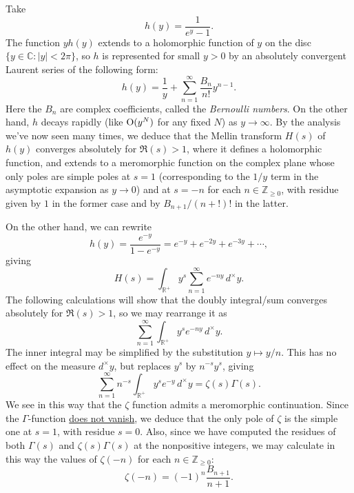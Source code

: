 \documentclass[reqno]{amsart}  \numberwithin{theorem}{section} \numberwithin{equation}{section}
\begin{document}
\begin{example}
  Take
  \begin{equation*}
h(y) = \frac{1}{e^y - 1}.
  \end{equation*}
  The function $y h(y)$ extends to a holomorphic function of $y$ on the disc $\{y \in \mathbb{C} : \lvert y \rvert < 2 \pi \}$, so $h$ is represented for small $y > 0$ by an absolutely convergent Laurent series of the following form:
  \begin{equation*}
h(y) = \frac{1}{y} + \sum_{n = 1 }^\infty \frac{B_n  }{ n !} y^{n - 1}.
  \end{equation*}
  Here the $B_n$ are complex coefficients, called the \emph{Bernoulli numbers}.  On the other hand, $h$ decays rapidly (like $\operatorname{O}(y^N)$ for any fixed $N$) as $y \rightarrow \infty$.  By the analysis we've now seen many times, we deduce that the Mellin transform $H(s)$ of $h(y)$ converges absolutely for $\Re(s) > 1$, where it defines a holomorphic function, and extends to a meromorphic function on the complex plane whose only poles are simple poles at $s = 1$ (corresponding to the $1/y$ term in the asymptotic expansion as $y \rightarrow 0$) and at $s = -n$ for each $n \in \mathbb{Z}_{\geq 0}$, with residue given by $1$ in the former case and by $B_{n+1} / (n+!)!$ in the latter.

  On the other hand, we can rewrite
  \begin{equation*}
    h(y) = \frac{e^{- y}}{ 1 - e^{- y}}
    = e^{- y } + e^{- 2 y } + e^{- 3 y} + \dotsb,
  \end{equation*}
  giving
  \begin{equation*}
    H(s) = \int_{\mathbb{R}^+ } y^s \sum_{n = 1 }^\infty e^{- n y } \,d^\times y.
  \end{equation*}
  The following calculations will show that the doubly integral/sum converges absolutely for $\Re(s) > 1$, so we may rearrange it as
  \begin{equation*}
\sum_{n = 1 }^\infty \int_{\mathbb{R}^+ } y^s e^{- n y } \,d^\times y.
  \end{equation*}
  The inner integral may be simplified by the substitution $y \mapsto y /n$.  This has no effect on the measure $d^\times y$, but replaces $y^s$ by $n^{-s} y^s$, giving
  \begin{equation*}
    \sum_{n = 1 }^\infty n^{- s} \int_{\mathbb{R}^+ } y^s e^{- y } \,d^\times y
    = \zeta(s) \Gamma(s).
  \end{equation*}
  We see in this way that the $\zeta$ function admits a meromorphic continuation.  Since the $\Gamma$-function \href{https://www.proofwiki.org/wiki/Zeroes_of_Gamma_Function}{does not vanish}, we deduce that the only pole of $\zeta$ is the simple one at $s=1$, with residue $s=0$.  Also, since we have computed the residues of both $\Gamma(s)$ and $\zeta(s) \Gamma(s)$ at the nonpositive integers, we may calculate in this way the values of $\zeta(-n)$ for each $n \in \mathbb{Z}_{\geq 0}$:
  \begin{equation*}
\zeta(-n) = (-1)^n \frac{B_{n + 1}}{ n + 1}.
\end{equation*}
\end{example}



{} 
\end{document}
